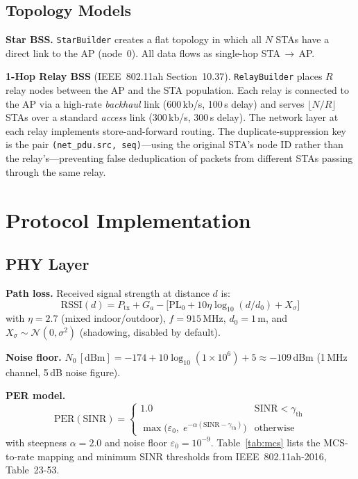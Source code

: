 \documentclass[conference]{IEEEtran}
\begin{document}
\subsection{Topology Models}

\textbf{Star BSS.} \texttt{StarBuilder} creates a flat topology in which all
$N$ STAs have a direct link to the AP (node~0).
All data flows as single-hop STA$\,\to$\,AP.

\textbf{1-Hop Relay BSS} (IEEE~802.11ah Section~10.37).
\texttt{RelayBuilder} places $R$ relay nodes between the AP and the STA
population.
Each relay is connected to the AP via a high-rate \emph{backhaul} link
($600$\,kb/s, 100\,\textmu{}s delay) and serves $\lfloor N/R \rfloor$
STAs over a standard \emph{access} link (300\,kb/s, 300\,\textmu{}s delay).
The network layer at each relay implements store-and-forward routing.
The duplicate-suppression key is the pair
\texttt{(net\_pdu.src, seq)}---using the original STA's node ID rather
than the relay's---preventing false deduplication of packets from different
STAs passing through the same relay.

\section{Protocol Implementation}
\label{sec:protocol}

\subsection{PHY Layer}

\textbf{Path loss.}
Received signal strength at distance $d$ is:
\begin{equation}
  \mathrm{RSSI}(d) = P_\mathrm{tx} + G_a
    - \bigl[\mathrm{PL}_0 + 10\eta\log_{10}(d/d_0) + X_\sigma\bigr]
\end{equation}
with $\eta{=}2.7$ (mixed indoor/outdoor), $f{=}915$\,MHz, $d_0{=}1$\,m,
and $X_\sigma \sim \mathcal{N}(0,\sigma^2)$ (shadowing, disabled by default).

\textbf{Noise floor.}
$N_0\,[\mathrm{dBm}] = -174 + 10\log_{10}(1{\times}10^6) + 5 \approx -109$\,dBm
(1\,MHz channel, 5\,dB noise figure).

\textbf{PER model.}
\begin{equation}
  \mathrm{PER}(\mathrm{SINR}) =
  \begin{cases}
    1.0
      & \mathrm{SINR} < \gamma_\mathrm{th} \\
    \max\!\bigl(\varepsilon_0,\;
               e^{-\alpha(\mathrm{SINR} - \gamma_\mathrm{th})}\bigr)
      & \mathrm{otherwise}
  \end{cases}
\end{equation}
with steepness $\alpha{=}2.0$ and noise floor $\varepsilon_0{=}10^{-9}$.
Table~\ref{tab:mcs} lists the MCS-to-rate mapping and minimum SINR
thresholds from IEEE~802.11ah-2016, Table~23-53.
\end{document}
